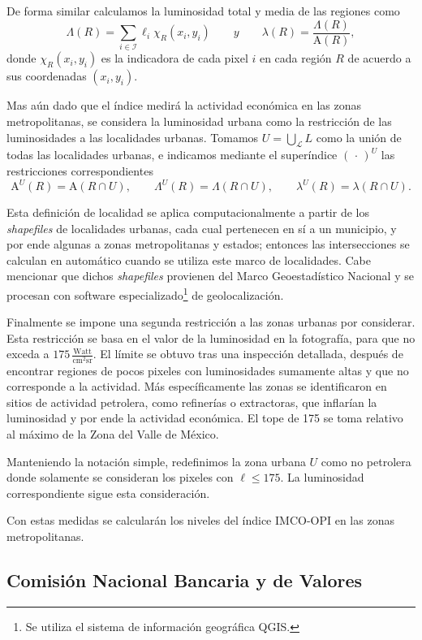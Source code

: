 \documentclass[]{article}
\let\rmarkdownfootnote\footnote%
\def\footnote{\protect\rmarkdownfootnote}
\begin{document}
De forma similar calculamos la luminosidad total y media de las regiones
como
\[ \Lambda(R) = \sum\limits_{i \in \mathcal{I}} \ell_i \chi_R(x_i,y_i) \qquad y
      \qquad \lambda(R) = \frac{\Lambda(R)}{\mathrm{A}(R)}, \] donde
\(\chi_R(x_i,y_i)\) es la indicadora de cada pixel \(i\) en cada región
\(R\) de acuerdo a sus coordenadas \((x_i, y_i)\).

Mas aún dado que el índice medirá la actividad económica en las zonas
metropolitanas, se considera la luminosidad urbana como la restricción
de las luminosidades a las localidades urbanas. Tomamos
\(U = \bigcup_\mathcal{L}L\) como la unión de todas las localidades
urbanas, e indicamos mediante el superíndice \((\,\cdot\,)^U\) las
restricciones correspondientes
\[ \mathrm{A}^U(R) = \mathrm{A}(R \cap U), \qquad 
      \Lambda^U(R) = \Lambda(R \cap U), \qquad 
      \lambda^U(R) = \lambda(R \cap U). \]

Esta definición de localidad se aplica computacionalmente a partir de
los \emph{shapefiles} de localidades urbanas, cada cual pertenecen en sí
a un municipio, y por ende algunas a zonas metropolitanas y estados;
entonces las intersecciones se calculan en automático cuando se utiliza
este marco de localidades. Cabe mencionar que dichos \emph{shapefiles}
provienen del Marco Geoestadístico Nacional y se procesan con software
especializado\footnote{Se utiliza el sistema de información geográfica
  QGIS.} de geolocalización.

Finalmente se impone una segunda restricción a las zonas urbanas por
considerar. Esta restricción se basa en el valor de la luminosidad en la
fotografía, para que no exceda a
\(175\,\frac{\text{Watt}}{\text{cm}^2 \text{sr}}\). El límite se obtuvo
tras una inspección detallada, después de encontrar regiones de pocos
pixeles con luminosidades sumamente altas y que no corresponde a la
actividad. Más específicamente las zonas se identificaron en sitios de
actividad petrolera, como refinerías o extractoras, que inflarían la
luminosidad y por ende la actividad económica. El tope de 175 se toma
relativo al máximo de la Zona del Valle de México.

Manteniendo la notación simple, redefinimos la zona urbana \(U\) como no
petrolera donde solamente se consideran los pixeles con
\(\ell \leq 175\). La luminosidad correspondiente sigue esta
consideración.

Con estas medidas se calcularán los niveles del índice IMCO-OPI en las
zonas metropolitanas.

\subsection{Comisión Nacional Bancaria y de
Valores}\label{comision-nacional-bancaria-y-de-valores}
\end{document}
